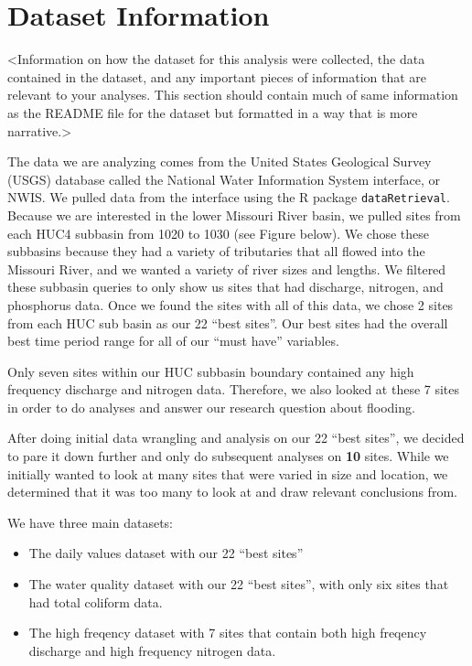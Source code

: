 \documentclass[12pt,]{article}
\begin{document}
\newpage

\hypertarget{dataset-information}{%
\section{Dataset Information}\label{dataset-information}}

\textless{}Information on how the dataset for this analysis were
collected, the data contained in the dataset, and any important pieces
of information that are relevant to your analyses. This section should
contain much of same information as the README file for the dataset but
formatted in a way that is more narrative.\textgreater{}

The data we are analyzing comes from the United States Geological Survey
(USGS) database called the National Water Information System interface,
or NWIS. We pulled data from the interface using the R package
\texttt{dataRetrieval}. Because we are interested in the lower Missouri
River basin, we pulled sites from each HUC4 subbasin from 1020 to 1030
(see Figure below). We chose these subbasins because they had a variety
of tributaries that all flowed into the Missouri River, and we wanted a
variety of river sizes and lengths. We filtered these subbasin queries
to only show us sites that had discharge, nitrogen, and phosphorus data.
Once we found the sites with all of this data, we chose 2 sites from
each HUC sub basin as our 22 ``best sites''. Our best sites had the
overall best time period range for all of our ``must have'' variables.

Only seven sites within our HUC subbasin boundary contained any high
frequency discharge and nitrogen data. Therefore, we also looked at
these 7 sites in order to do analyses and answer our research question
about flooding.

After doing initial data wrangling and analysis on our 22 ``best
sites'', we decided to pare it down further and only do subsequent
analyses on \textbf{10} sites. While we initially wanted to look at many
sites that were varied in size and location, we determined that it was
too many to look at and draw relevant conclusions from.

We have three main datasets:

\begin{itemize}
\item
  The daily values dataset with our 22 ``best sites''
\item
  The water quality dataset with our 22 ``best sites'', with only six
  sites that had total coliform data.
\item
  The high freqency dataset with 7 sites that contain both high freqency
  discharge and high frequency nitrogen data.
\end{itemize}
\end{document}
